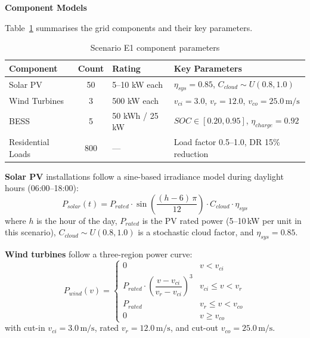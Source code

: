 \medskip\noindent\textbf{Component Models}

Table~\ref{tab:e1_components} summarises the grid components and their key parameters.

\begin{table}[h]
    \centering
    \small
    \begin{tabular}{|l|c|l|l|}
        \hline
        \textbf{Component} & \textbf{Count} & \textbf{Rating} & \textbf{Key Parameters} \\
        \hline
        Solar PV & 50 & 5--10 kW each & $\eta_{sys} = 0.85$, $C_{cloud} \sim U(0.8, 1.0)$ \\
        \hline
        Wind Turbines & 3 & 500 kW each & $v_{ci} = 3.0$, $v_r = 12.0$, $v_{co} = 25.0\,\text{m/s}$ \\
        \hline
        BESS & 5 & 50 kWh / 25 kW & $SOC \in [0.20, 0.95]$, $\eta_{charge} = 0.92$ \\
        \hline
        Residential Loads & 800 & --- & Load factor 0.5--1.0, DR 15\% reduction \\
        \hline
    \end{tabular}
    \caption{Scenario E1 component parameters}
    \label{tab:e1_components}
\end{table}

\textbf{Solar PV} installations follow a sine-based irradiance model during daylight hours (06:00--18:00):
\begin{equation}
P_{solar}(t) = P_{rated} \cdot \sin\!\left(\frac{(h-6)\,\pi}{12}\right) \cdot C_{cloud} \cdot \eta_{sys}
\label{eq:solar_power}
\end{equation}
where $h$ is the hour of the day, $P_{rated}$ is the PV rated power (5--10\,kW per unit in this scenario), $C_{cloud} \sim U(0.8, 1.0)$ is a stochastic cloud factor, and $\eta_{sys} = 0.85$.

\textbf{Wind turbines} follow a three-region power curve:
\begin{equation}
P_{wind}(v) =
\begin{cases}
0 & v < v_{ci} \\[4pt]
P_{rated} \cdot \!\left(\dfrac{v - v_{ci}}{v_{r} - v_{ci}}\right)^{\!3} & v_{ci} \leq v < v_{r} \\[4pt]
P_{rated} & v_{r} \leq v < v_{co} \\[4pt]
0 & v \geq v_{co}
\end{cases}
\label{eq:wind_power}
\end{equation}
with cut-in $v_{ci} = 3.0\,\text{m/s}$, rated $v_{r} = 12.0\,\text{m/s}$, and cut-out $v_{co} = 25.0\,\text{m/s}$.

